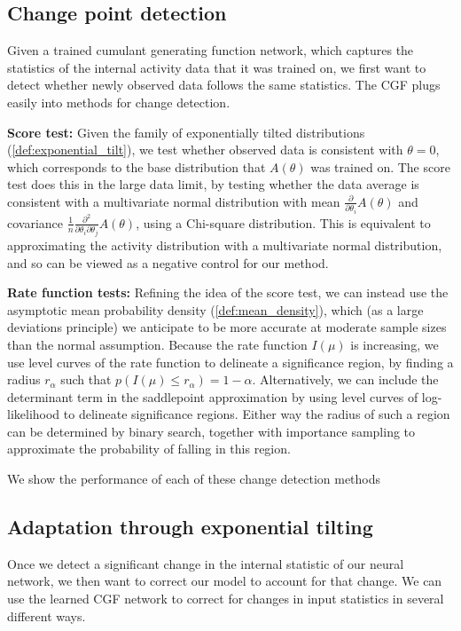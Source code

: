 \documentclass{article}      %
\begin{document}
\subsection{Change point detection}
Given a trained cumulant generating function network, which captures the statistics of the internal activity data that it was trained on, we first want to detect whether newly observed data follows the same statistics.
The CGF plugs easily into methods for change detection.

\textbf{Score test:} \cite{cox1979theoretical} 
Given the family of exponentially tilted distributions (\ref{def:exponential_tilt}), we test whether observed data is consistent with $\theta = 0$, which corresponds to the base distribution that $A(\theta)$ was trained on.
The score test does this in the large data limit, by testing whether the data average is consistent with a multivariate normal distribution with mean $\frac{\partial}{\partial \theta_i} A(\theta)$ and covariance $\frac{1}{n}\frac{\partial^2}{\partial \theta_i \partial \theta_j} A(\theta)$, using a Chi-square distribution.
This is equivalent to approximating the activity distribution with a multivariate normal distribution, and so can be viewed as a negative control for our method. 

\textbf{Rate function tests:} Refining the idea of the score test, we can instead use the asymptotic mean probability density (\ref{def:mean_density}), which (as a large deviations principle) we anticipate to be more accurate at moderate sample sizes than the normal assumption.
Because the rate function $I(\mu)$ is increasing, we use level curves of the rate function to delineate a significance region, by finding a radius $r_\alpha$ such that ${p(I(\mu) \le r_\alpha) = 1 - \alpha}$.
Alternatively, we can include the determinant term in the saddlepoint approximation by using level curves of log-likelihood to delineate significance regions.
Either way the radius of such a region can be determined by binary search, together with importance sampling to approximate the probability of falling in this region.

We show the performance of each of these change detection methods 

\subsection{Adaptation through exponential tilting}
Once we detect a significant change in the internal statistic of our neural network, we then want to correct our model to account for that change.
We can use the learned CGF network to correct for changes in input statistics in several different ways.
\end{document}
